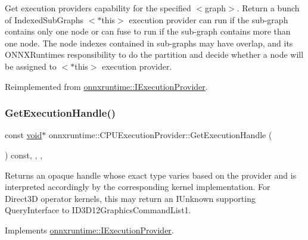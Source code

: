 Get execution provider\textquotesingle{}s capability for the specified $<$graph$>$. Return a bunch of Indexed\+Sub\+Graphs $<$$\ast$this$>$ execution provider can run if the sub-\/graph contains only one node or can fuse to run if the sub-\/graph contains more than one node. The node indexes contained in sub-\/graphs may have overlap, and it\textquotesingle{}s O\+N\+N\+X\+Runtime\textquotesingle{}s responsibility to do the partition and decide whether a node will be assigned to $<$$\ast$this$>$ execution provider. 

Reimplemented from \mbox{\hyperlink{classonnxruntime_1_1IExecutionProvider_a6f17ba64b2355b26293a4cfc3fac376f}{onnxruntime\+::\+I\+Execution\+Provider}}.

\mbox{\label{classonnxruntime_1_1CPUExecutionProvider_a43c0400ad3529ffc272f5db39682e0f8}} 
\subsubsection{\texorpdfstring{Get\+Execution\+Handle()}{GetExecutionHandle()}}
{\footnotesize\ttfamily const \mbox{\hyperlink{mlasi_8h_a88f941d423cb2a819b70a1358982b1a6}{void}}$\ast$ onnxruntime\+::\+C\+P\+U\+Execution\+Provider\+::\+Get\+Execution\+Handle (\begin{DoxyParamCaption}{ }\end{DoxyParamCaption}) const\hspace{0.3cm}{\ttfamily [inline]}, {\ttfamily [override]}, {\ttfamily [virtual]}, {\ttfamily [noexcept]}}

Returns an opaque handle whose exact type varies based on the provider and is interpreted accordingly by the corresponding kernel implementation. For Direct3D operator kernels, this may return an I\+Unknown supporting Query\+Interface to I\+D3\+D12\+Graphics\+Command\+List1. 

Implements \mbox{\hyperlink{classonnxruntime_1_1IExecutionProvider_aebaeab04945539bc5db5942b63684ccb}{onnxruntime\+::\+I\+Execution\+Provider}}.

\mbox{\label{classonnxruntime_1_1CPUExecutionProvider_a549e5e72c5c08a72a3e4a00b5e872f23}} 
